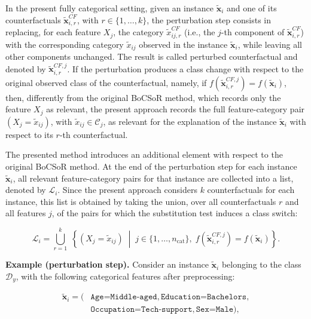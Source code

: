 In the present fully categorical setting, given an instance $\tilde{\mathbf{x}}_i$ and one of its counterfactuals $\tilde{\mathbf{x}}_{i,r}^{CF}$, with $r \in \{1,\dots,k\}$, the perturbation step consists in replacing, for each feature $X_j$, the category $\tilde{x}_{ij,r}^{CF}$ (i.e., the $j$-th component of $\tilde{\mathbf{x}}_{i,r}^{CF}$) with the corresponding category $\tilde{x}_{ij}$ observed in the instance $\tilde{\mathbf{x}}_i$, while leaving all other components unchanged. The result is called perturbed counterfactual and denoted by $\tilde{\mathbf{x}}_{i,r}^{CF,j}$.
If the perturbation produces a class change with respect to the original observed class of the counterfactual, namely, if $f(\tilde{\mathbf{x}}_{i,r}^{CF,j}) = f(\tilde{\mathbf{x}}_i)$, then, differently from the original BoCSoR method, which records only the feature $X_j$ as relevant, the present approach records the full feature-category pair $(X_j = \tilde{x}_{ij})$, with $\tilde{x}_{ij} \in \mathcal{C}_j$, as relevant for the explanation of the instance $\tilde{\mathbf{x}}_i$ with respect to its $r$-th counterfactual.

The presented method introduces an additional element with respect to the original BoCSoR method. At the end of the perturbation step for each instance $\tilde{\mathbf{x}}_i$, all relevant feature-category pairs for that instance are collected into a list, denoted by $\mathcal{L}_i$. Since the present approach considers $k$ counterfactuals for each instance, this list is obtained by taking the union, over all counterfactuals $r$ and all features $j$, of the pairs for which the substitution test induces a class switch:

\begin{equation}
  \mathcal{L}_i = \bigcup_{r=1}^{k}\; \left\{ (X_j = \tilde{x}_{ij}) \;\middle|\; j \in \{1,\dots,n_{\mathrm{cat}}\},\; f(\tilde{\mathbf{x}}_{i,r}^{CF,j}) = f(\tilde{\mathbf{x}}_i) \right\}.
\end{equation}

\noindent\textbf{Example (perturbation step).} Consider an instance $\tilde{\mathbf{x}}_i$ belonging to the class $\mathcal{D}_y$, with the following categorical features after preprocessing:

\begin{equation*}
  \begin{aligned}
    \tilde{\mathbf{x}}_i = (&\texttt{Age=Middle-aged}, \texttt{Education=Bachelors}, \\
    &\texttt{Occupation=Tech-support}, \texttt{Sex=Male}),
  \end{aligned}
\end{equation*}

